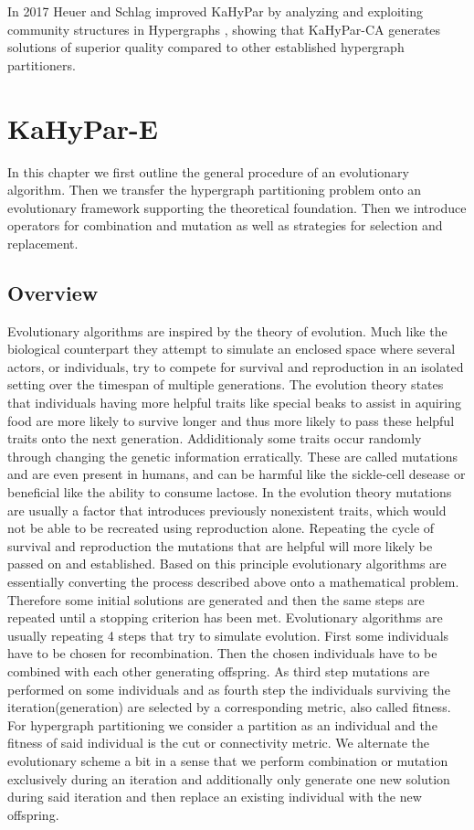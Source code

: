 \documentclass[a4paper,12pt,titlepage, BCOR7mm,headsepline]{scrbook}
\numberwithin{equation}{section}
\begin{document}
In 2017 Heuer and Schlag improved KaHyPar by analyzing and exploiting community structures in Hypergraphs \cite{heuer2017improving}, showing that KaHyPar-CA generates solutions of superior quality compared to other established hypergraph partitioners.

\chapter{KaHyPar-E}
In this chapter we first outline the general procedure of an evolutionary algorithm. Then we transfer the hypergraph partitioning problem onto an evolutionary framework supporting the 
theoretical foundation. Then we introduce operators for combination and mutation as well as strategies for selection and replacement.
\section{Overview}
Evolutionary algorithms are inspired by the theory of evolution. Much like the biological counterpart they attempt to simulate 
an enclosed space where several actors, or individuals, try to compete for survival and reproduction in an isolated setting over the timespan of multiple generations.
The evolution theory states that individuals having more helpful traits like special beaks to assist in aquiring food are more likely to survive longer and 
thus more likely to pass these helpful traits onto the next generation. Addiditionaly some traits occur randomly through changing the genetic information erratically. These are called mutations and are even present in humans, and can be harmful like the sickle-cell desease or beneficial like the ability to consume lactose. In the evolution theory mutations 
are usually a factor that introduces previously nonexistent traits, which would not be able to be recreated using reproduction alone. Repeating the cycle of survival and reproduction the mutations that are helpful will more likely be passed on and established. Based on this principle evolutionary algorithms are essentially converting the process described above onto a mathematical problem. Therefore some initial solutions are generated and then the same steps are repeated until a stopping criterion has been met.
Evolutionary algorithms are usually repeating 4 steps that try to simulate evolution. First some individuals have to be chosen for recombination. Then the chosen individuals have to be combined with each other generating offspring. As third step mutations are performed on some individuals and as fourth step the individuals surviving the iteration(generation) are selected by a corresponding metric, also called fitness. For hypergraph partitioning we consider a partition as an individual and the fitness of said individual is the cut or connectivity metric. We alternate the evolutionary scheme a bit in a sense that we perform combination or mutation exclusively during an iteration and additionally only generate one new solution during said iteration and then replace an existing individual with the new offspring. 
\end{document}
